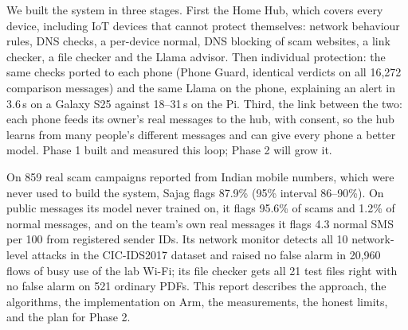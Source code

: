 \documentclass[11pt,a4paper]{article}
\begin{document}
We built the system in three stages. First the Home Hub, which covers every device, including IoT devices
that cannot protect themselves: network behaviour rules, DNS checks, a per-device normal, DNS blocking of
scam websites, a link checker, a file checker and the Llama advisor. Then individual protection: the same
checks ported to each phone (Phone Guard, identical verdicts on all 16,272 comparison messages) and the same
Llama on the phone, explaining an alert in 3.6\,s on a Galaxy S25 against 18--31\,s on the Pi. Third, the
link between the two: each phone feeds its owner's real messages to the hub, with consent, so the hub learns
from many people's different messages and can give every phone a better model. Phase 1 built and measured
this loop; Phase 2 will grow it.

On 859 real scam campaigns reported from Indian mobile numbers, which were never used to build the system,
Sajag flags 87.9\% (95\% interval 86--90\%). On public messages its model never trained on, it flags 95.6\%
of scams and 1.2\% of normal messages, and on the team's own real messages it flags 4.3 normal SMS per 100 from
registered sender IDs. Its network monitor detects all 10 network-level attacks in the CIC-IDS2017 dataset and raised no false
alarm in 20,960 flows of busy use of the lab Wi-Fi; its file checker gets all 21 test files right with no
false alarm on 521 ordinary PDFs.
This report describes the approach, the algorithms, the implementation on Arm, the measurements,
the honest limits, and the plan for Phase 2.
\end{document}
